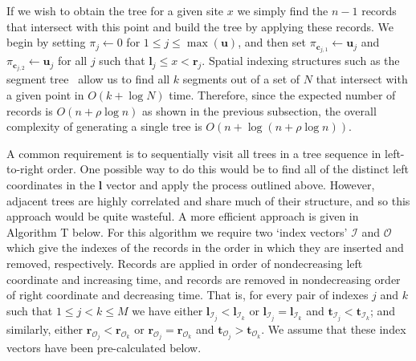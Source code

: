 \documentclass[10pt,letterpaper]{article}
\newcommand{\vect}[1]{\ensuremath{\mathbf{#1}}}
\newcommand{\indexin}[0]{\ensuremath{\mathcal{I}}}
\newcommand{\indexout}[0]{\ensuremath{\mathcal{O}}}
\begin{document}
If we wish to obtain the tree for a given site $x$ we simply find the $n - 1$
records that intersect with this point and build the tree by applying these
records. We begin by setting $\pi_j \leftarrow 0 $ for $1 \leq j \leq
\max(\vect{u})$, and then set $\pi_{\vect{c}_{j, 1}} \leftarrow \vect{u}_{j}$
and $\pi_{\vect{c}_{j, 2}} \leftarrow \vect{u}_{j}$ for all $j$ such that
$\vect{l}_j \leq x < \vect{r}_j$. Spatial indexing structures
such as the segment tree~\citep{s89} allow us to find all $k$ segments out
of a set of $N$ that intersect with a given point in $O(k + \log N)$ time.
Therefore, since the expected number of records is
$O(n + \rho \log n)$ as shown in the previous subsection,
the overall complexity of generating a single tree
is $O(n + \log(n + \rho \log n))$.

A common requirement is to sequentially visit all trees in a tree sequence in
left-to-right order. One possible way to do this would be to find all of the
distinct left coordinates in the $\vect{l}$ vector and apply the process outlined
above. However, adjacent trees are highly correlated and share much of their
structure, and so this approach would be quite wasteful.
A more efficient approach is given in Algorithm T below. For this algorithm
we require two `index vectors' $\indexin$ and $\indexout$ which give
the indexes of the records in the order in which they are inserted
and removed, respectively. Records are applied in order of nondecreasing
left coordinate and increasing time, and records are removed in nondecreasing
order of right coordinate and decreasing time. That is, for every
pair of indexes $j$ and $k$ such that  $1 \leq j < k \leq M$ we
have either $\vect{l}_{\indexin_j} < \vect{l}_{\indexin_{k}}$ or
$\vect{l}_{\indexin_j} = \vect{l}_{\indexin_{k}}$ and
$\vect{t}_{\indexin_j} < \vect{t}_{\indexin_{k}}$;
and similarly, either
$\vect{r}_{\indexout_j} < \vect{r}_{\indexout_{k}}$ or
$\vect{r}_{\indexout_j} = \vect{r}_{\indexout_{k}}$ and
$\vect{t}_{\indexout_j} > \vect{t}_{\indexout_{k}}$. We assume that
these index vectors have been pre-calculated below.
\end{document}
